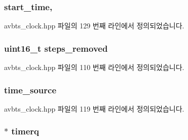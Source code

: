 \subsubsection[{\texorpdfstring{start\+\_\+time}{start_time}}]{ start\+\_\+time\hspace{0.3cm}{\ttfamily [static]}, {\ttfamily [private]}}\hypertarget{class_i_e_e_e1588_clock_ac1c443e970535eaf9e0ed94855c0ff4c}{}\label{class_i_e_e_e1588_clock_ac1c443e970535eaf9e0ed94855c0ff4c}


avbts\+\_\+clock.\+hpp 파일의 129 번째 라인에서 정의되었습니다.

\subsubsection[{\texorpdfstring{steps\+\_\+removed}{steps_removed}}]{\setlength{\rightskip}{0pt plus 5cm}uint16\+\_\+t steps\+\_\+removed\hspace{0.3cm}{\ttfamily [private]}}\hypertarget{class_i_e_e_e1588_clock_ace02db8080fa03d9670d0a3de68161c2}{}\label{class_i_e_e_e1588_clock_ace02db8080fa03d9670d0a3de68161c2}


avbts\+\_\+clock.\+hpp 파일의 110 번째 라인에서 정의되었습니다.

\subsubsection[{\texorpdfstring{time\+\_\+source}{time_source}}]{ time\+\_\+source\hspace{0.3cm}{\ttfamily [private]}}\hypertarget{class_i_e_e_e1588_clock_aca8fb87cde2fc6c2f46e7332b5b8f1b8}{}\label{class_i_e_e_e1588_clock_aca8fb87cde2fc6c2f46e7332b5b8f1b8}


avbts\+\_\+clock.\+hpp 파일의 119 번째 라인에서 정의되었습니다.

\subsubsection[{\texorpdfstring{timerq}{timerq}}]{$\ast$ timerq\hspace{0.3cm}{\ttfamily [private]}}\hypertarget{class_i_e_e_e1588_clock_a1e7ff34593ba8567fd2b6bbd988db63e}{}\label{class_i_e_e_e1588_clock_a1e7ff34593ba8567fd2b6bbd988db63e}


